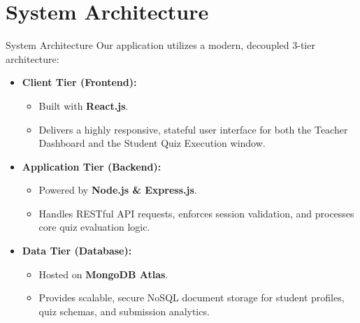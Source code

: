 \documentclass[aspectratio=169, 11pt]{beamer}
\begin{document}
\section{System Architecture}
\begin{frame}{System Architecture}
    Our application utilizes a modern, decoupled 3-tier architecture:
    \vspace{0.3cm}
    \begin{itemize}
        \item \textbf{Client Tier (Frontend):} 
        \begin{itemize}
            \item Built with \textbf{React.js}.
            \item Delivers a highly responsive, stateful user interface for both the Teacher Dashboard and the Student Quiz Execution window.
        \end{itemize}
        \item \textbf{Application Tier (Backend):} 
        \begin{itemize}
            \item Powered by \textbf{Node.js \& Express.js}.
            \item Handles RESTful API requests, enforces session validation, and processes core quiz evaluation logic.
        \end{itemize}
        \item \textbf{Data Tier (Database):} 
        \begin{itemize}
            \item Hosted on \textbf{MongoDB Atlas}.
            \item Provides scalable, secure NoSQL document storage for student profiles, quiz schemas, and submission analytics.
        \end{itemize}
    \end{itemize}
\end{frame}

\end{document}
